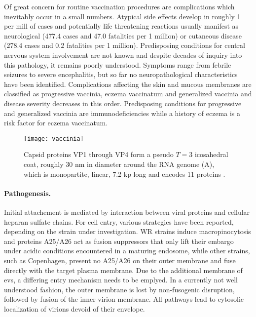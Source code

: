 Of great concern for routine vaccination procedures are complications which inevitably occur in a small numbers. Atypical side effects develop in roughly 1 per mill of cases and potentially life threatening reactions usually manifest as neurological (477.4 cases and 47.0 fatalities per 1 million) or cutaneous disease (278.4 cases and 0.2 fatalities per 1 million). Predisposing conditions for central nervous system involvement are not known and despite decades of inquiry into this pathology, it remains poorly understood. Symptoms range from febrile seizures to severe encephalitis, but so far no  neuropathological characteristics have been identified. Complications affecting the skin and mucous membranes are classified as progressive vaccinia, eczema vaccinatum and generalized vaccinia and disease severity decreases in this order. Predisposing conditions for progressive and generalized vaccinia are immunodeficiencies while a history of eczema is a risk factor for eczema vaccinatum.

\begin{figure}[t]
  \centering
  \texttt{[image: vaccinia]}
  \caption[Replication cycle of \textit{Vaccinia viruses} for both intracellular mature and extracellular enveloped virions.]{Capsid proteins VP1 through VP4 form a pseudo $T=3$ icosahedral coat, roughly 30 nm in diameter around the RNA genome (A), which is monopartite, linear, 7.2 kp long and encodes 11 proteins \citep{Hulo2011}.}
  \label{fig:vaccinia}
\end{figure}

\paragraph{Pathogenesis.}
Initial attachement is mediated by interaction between viral proteins and cellular heparan sulfate chains. For cell entry, various strategies have been reported, depending on the strain under investigation. WR strains induce macropinocytosis and proteins A25/A26 act as fusion suppressors that only lift their embargo under acidic conditions encountered in a maturing endosome, while other strains, such as Copenhagen, present no A25/A26 on their outer membrane and fuse directly with the target plasma membrane. Due to the additional membrane of \glspl{ev}, a differing entry mechanism needs to be emplyed. In a currently not well understood fashion, the outer membrane is lost by non-fusogenic disruption, followed by fusion of the inner virion membrane. All pathways lead to cytosolic localization of virions devoid of their envelope.


